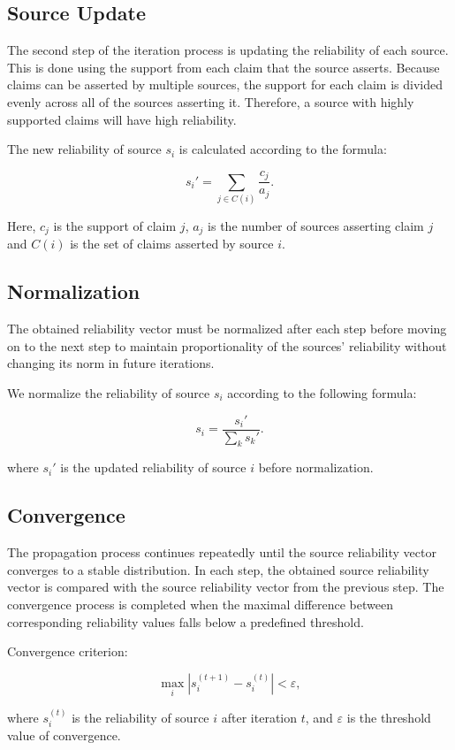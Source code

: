 \subsection{Source Update}

The second step of the iteration process is updating the reliability of each source. This is done using the support from each claim that the source asserts. Because claims can be asserted by multiple sources, the support for each claim is divided evenly across all of the sources asserting it. Therefore, a source with highly supported claims will have high reliability.

The new reliability of source $s_i$ is calculated according to the formula:

\begin{equation}
s_i' =
\sum_{j \in C(i)}
\frac{c_j}{a_j}.
\end{equation}

Here, $c_j$ is the support of claim $j$, $a_j$ is the number of sources asserting claim $j$ and $C(i)$ is the set of claims asserted by source $i$.

\subsection{Normalization}

The obtained reliability vector must be normalized after each step before moving on to the next step to maintain proportionality of the sources' reliability without changing its norm in future iterations.

We normalize the reliability of source $s_i$ according to the following formula:

\begin{equation}
s_i =
\frac{s_i'}
{\sum_k s_k'}.
\end{equation}

where $s_i'$ is the updated reliability of source $i$ before normalization.

\subsection{Convergence}

The propagation process continues repeatedly until the source reliability vector converges to a stable distribution. In each step, the obtained source reliability vector is compared with the source reliability vector from the previous step. The convergence process is completed when the maximal difference between corresponding reliability values falls below a predefined threshold.

Convergence criterion:

\begin{equation}
\max_i
\left|
s_i^{(t+1)}
-
s_i^{(t)}
\right|
<
\varepsilon,
\end{equation}

where $s_i^{(t)}$ is the reliability of source $i$ after iteration $t$, and $\varepsilon$ is the threshold value of convergence.
